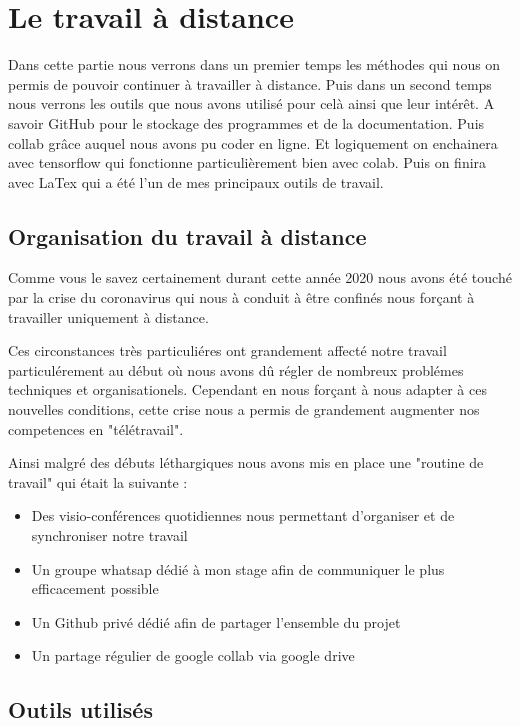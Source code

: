 
\hypertarget{Le-travail-a-distance}{%
\chapter{Le travail à distance}\label{Le-travail-a-distance}}

Dans cette partie nous verrons dans un premier temps les méthodes qui nous on permis de pouvoir continuer à travailler à distance. Puis dans un second temps nous verrons les outils que nous avons utilisé pour celà ainsi que leur intérêt. A savoir GitHub pour le stockage des programmes et de la documentation. Puis collab grâce auquel nous avons pu coder en ligne. Et logiquement on enchainera avec tensorflow qui fonctionne particulièrement bien avec colab. Puis on finira avec LaTex qui a été l'un de mes principaux outils de travail.

\hypertarget{Organisation-du-travail-a-distance}{%
\section{Organisation du travail à distance}\label{Organisation-du-travail-a-distance}}


Comme vous le savez certainement durant cette année 2020 nous avons été touché par la crise du coronavirus qui nous à conduit à être confinés nous forçant à travailler uniquement à distance.

Ces circonstances très particuliéres ont grandement affecté notre travail particulérement au début où nous avons dû régler de nombreux problémes techniques et organisationels. Cependant en nous forçant à nous adapter à ces nouvelles conditions, cette crise nous a permis de grandement augmenter nos competences en "télétravail".

Ainsi malgré des débuts léthargiques nous avons mis en place une "routine de travail" qui était la suivante :
\begin{itemize}
\item Des visio-conférences quotidiennes nous permettant d'organiser et de synchroniser notre travail
\item Un groupe whatsap dédié à mon stage afin de communiquer le plus efficacement possible
\item Un Github privé dédié afin de partager l'ensemble du projet
\item Un partage régulier de google collab via google drive
\end{itemize}

\hypertarget{Outils-utilisuxe9s}{%
\section{Outils utilisés}
\label{Outils-utilisuxe9s}}


